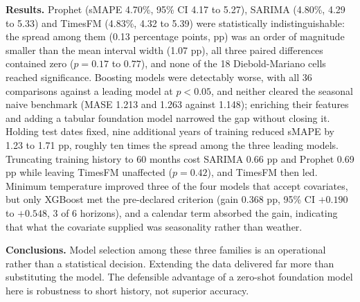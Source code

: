\noindent\textbf{Results.} Prophet (sMAPE 4.70\%, 95\% CI 4.17 to 5.27), SARIMA (4.80\%,
4.29 to 5.33) and TimesFM (4.83\%, 4.32 to 5.39) were statistically indistinguishable:
the spread among them (0.13 percentage points, pp) was an order of magnitude smaller than
the mean interval width (1.07 pp), all three paired differences contained zero
($p=0.17$ to $0.77$), and none of the 18 Diebold-Mariano cells reached significance.
Boosting models were detectably worse, with all 36 comparisons against a leading model at
$p<0.05$, and neither cleared the seasonal naive benchmark (MASE 1.213 and 1.263 against
1.148); enriching their features and adding a tabular foundation model narrowed the gap
without closing it. Holding test dates fixed, nine additional years of training reduced sMAPE by
1.23 to 1.71 pp, roughly ten times the spread among the three leading models. Truncating training
history to 60 months cost SARIMA 0.66 pp and Prophet 0.69 pp while leaving TimesFM
unaffected ($p=0.42$), and TimesFM then led. Minimum temperature improved three of the
four models that accept covariates, but only XGBoost met the pre-declared criterion (gain
0.368 pp, 95\% CI $+0.190$ to $+0.548$, 3 of 6 horizons), and a calendar term absorbed the
gain, indicating that what the covariate supplied was seasonality rather than weather.

\noindent\textbf{Conclusions.} Model selection among these three families is an
operational rather than a statistical decision. Extending the data delivered far more
than substituting the model. The defensible advantage of a zero-shot foundation model
here is robustness to short history, not superior accuracy.

